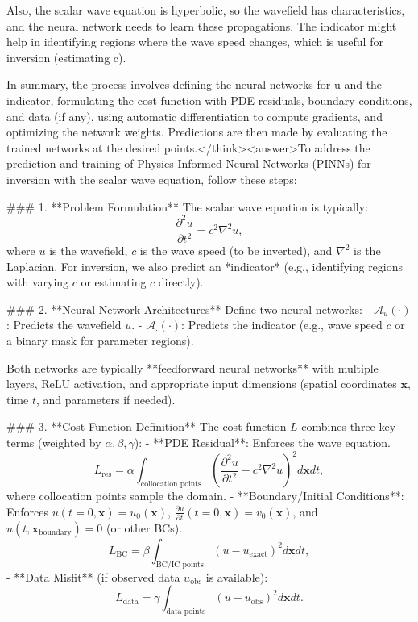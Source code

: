 Also, the scalar wave equation is hyperbolic, so the wavefield has characteristics, and the neural network needs to learn these propagations. The indicator might help in identifying regions where the wave speed changes, which is useful for inversion (estimating c).

In summary, the process involves defining the neural networks for u and the indicator, formulating the cost function with PDE residuals, boundary conditions, and data (if any), using automatic differentiation to compute gradients, and optimizing the network weights. Predictions are then made by evaluating the trained networks at the desired points.</think><answer>To address the prediction and training of Physics-Informed Neural Networks (PINNs) for inversion with the scalar wave equation, follow these steps:  


### 1. **Problem Formulation**  
The scalar wave equation is typically:  
\[
\frac{\partial^2 u}{\partial t^2} = c^2 \nabla^2 u,
\]  
where \( u \) is the wavefield, \( c \) is the wave speed (to be inverted), and \( \nabla^2 \) is the Laplacian. For inversion, we also predict an *indicator* (e.g., identifying regions with varying \( c \) or estimating \( c \) directly).  


### 2. **Neural Network Architectures**  
Define two neural networks:  
- \( \mathcal{A}_u(\cdot) \): Predicts the wavefield \( u \).  
- \( \mathcal{A}_\cdot(\cdot) \): Predicts the indicator (e.g., wave speed \( c \) or a binary mask for parameter regions).  

Both networks are typically **feedforward neural networks** with multiple layers, ReLU activation, and appropriate input dimensions (spatial coordinates \( \mathbf{x} \), time \( t \), and parameters if needed).  


### 3. **Cost Function Definition**  
The cost function \( L \) combines three key terms (weighted by \( \alpha, \beta, \gamma \)):  
- **PDE Residual**: Enforces the wave equation.  
  \[
  L_{\text{res}} = \alpha \int_{\text{collocation points}} \left( \frac{\partial^2 u}{\partial t^2} - c^2 \nabla^2 u \right)^2 d\mathbf{x} dt,
  \]  
  where collocation points sample the domain.  
- **Boundary/Initial Conditions**: Enforces \( u(t=0, \mathbf{x}) = u_0(\mathbf{x}) \), \( \frac{\partial u}{\partial t}(t=0, \mathbf{x}) = v_0(\mathbf{x}) \), and \( u(t, \mathbf{x}_{\text{boundary}}) = 0 \) (or other BCs).  
  \[
  L_{\text{BC}} = \beta \int_{\text{BC/IC points}} \left( u - u_{\text{exact}} \right)^2 d\mathbf{x} dt,
  \]  
- **Data Misfit** (if observed data \( u_{\text{obs}} \) is available):  
  \[
  L_{\text{data}} = \gamma \int_{\text{data points}} \left( u - u_{\text{obs}} \right)^2 d\mathbf{x} dt.
  \]  

